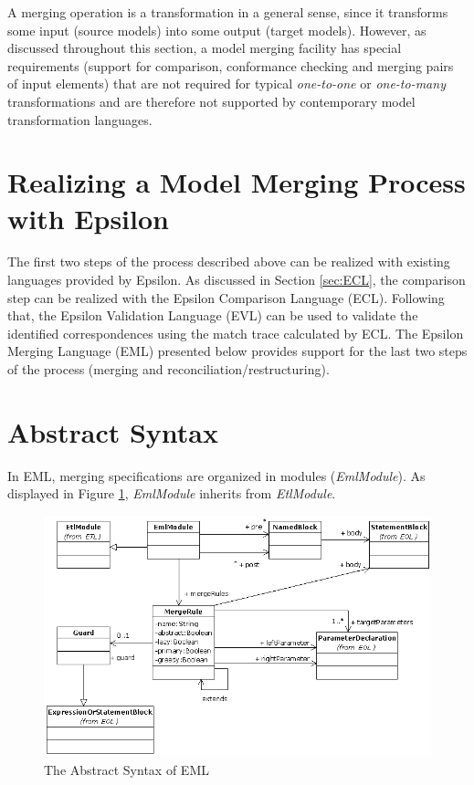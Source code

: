 A merging operation is a transformation in a general sense, since it transforms some input (source models) into some output (target models). However, as discussed throughout this section, a model merging facility has special requirements (support for comparison, conformance checking and merging pairs of input elements) that are not required for typical \textit{one-to-one} or \textit{one-to-many} transformations \cite{Czarnecki2003} and are therefore not supported by contemporary model transformation languages.

\section{Realizing a Model Merging Process with Epsilon}

The first two steps of the process described above can be realized with existing languages provided by Epsilon. As discussed in Section \ref{sec:ECL}, the comparison step can be realized with the Epsilon Comparison Language (ECL). Following that, the Epsilon Validation Language (EVL) can be used to validate the identified correspondences using the match trace calculated by ECL. The Epsilon Merging Language (EML) presented below provides support for the last two steps of the process (merging and reconciliation/restructuring).

\section{Abstract Syntax}

In EML, merging specifications are organized in modules (\emph{EmlModule}). As displayed in Figure \ref{fig:EmlAbstractSyntax}, \emph{EmlModule} inherits from \emph{EtlModule}.

\begin{landscape}
\begin{figure}
	\centering
		\includegraphics{images/EmlAbstractSyntax.png}
	\caption{The Abstract Syntax of EML}
	\label{fig:EmlAbstractSyntax}
\end{figure}
\end{landscape}

